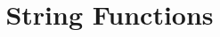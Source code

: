 \documentclass{ximera}
\title{String Functions}
\begin{document}
\begin{abstract}
\end{abstract}

\maketitle
\end{document}
